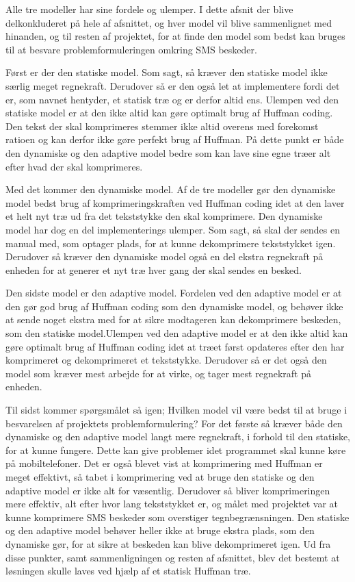Alle tre modeller har sine fordele og ulemper. I dette afsnit der blive delkonkluderet på hele af afsnittet, og hver model vil blive sammenlignet med hinanden, og til resten af projektet, for at finde den model som bedst kan bruges til at besvare problemformuleringen omkring SMS beskeder.

Først er der den statiske model. Som sagt, så kræver den statiske model ikke særlig meget regnekraft. Derudover så er den også let at implementere fordi det er, som navnet hentyder, et statisk træ og er derfor altid ens. Ulempen ved den statiske model er at den ikke altid kan gøre optimalt brug af Huffman coding. Den tekst der skal komprimeres stemmer ikke altid overens med forekomst ratioen og kan derfor ikke gøre perfekt brug af Huffman. På dette punkt er både den dynamiske og den adaptive model bedre som kan lave sine egne træer alt efter hvad der skal komprimeres.

Med det kommer den dynamiske model. Af de tre modeller gør den dynamiske model bedst brug af komprimeringskraften ved Huffman coding idet at den laver et helt nyt træ ud fra det tekststykke den skal komprimere. Den dynamiske model har dog en del implementerings ulemper. Som sagt, så skal der sendes en manual med, som optager plads, for at kunne dekomprimere tekststykket igen. Derudover så kræver den dynamiske model også en del ekstra regnekraft på enheden for at generer et nyt træ hver gang der skal sendes en besked.

Den sidste model er den adaptive model. Fordelen ved den adaptive model er at den gør god brug af Huffman coding som den dynamiske model, og behøver ikke at sende noget ekstra med for at sikre modtageren kan dekomprimere beskeden, som den statiske model.Ulempen ved den adaptive model er at den ikke altid kan gøre optimalt brug af Huffman coding idet at træet først opdateres efter den har komprimeret og dekomprimeret et tekststykke. Derudover så er det også den model som kræver mest arbejde for at virke, og tager mest regnekraft på enheden.

Til sidst kommer spørgsmålet så igen; Hvilken model vil være bedst til at bruge i besvarelsen af projektets problemformulering? For det første så kræver både den dynamiske og den adaptive model langt mere regnekraft, i forhold til den statiske, for at kunne fungere. Dette kan give problemer idet programmet skal kunne køre på mobiltelefoner. Det er også blevet vist at komprimering med Huffman er meget effektivt, så tabet i komprimering ved at bruge den statiske og den adaptive model er ikke alt for væsentlig. Derudover så bliver komprimeringen mere effektiv, alt efter hvor lang tekststykket er, og målet med projektet var at kunne komprimere SMS beskeder som overstiger tegnbegrænsningen. Den statiske og den adaptive model behøver heller ikke at bruge ekstra plads, som den dynamiske gør, for at sikre at beskeden kan blive dekomprimeret igen. Ud fra disse punkter, samt sammenligningen og resten af afsnittet, blev det bestemt at løsningen skulle laves ved hjælp af et statisk Huffman træ.
